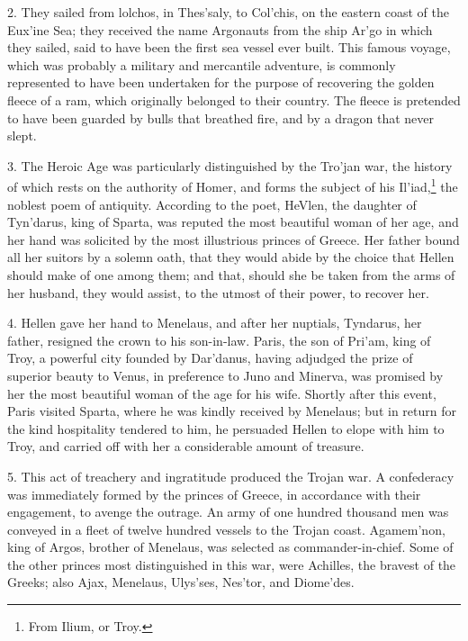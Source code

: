 \documentclass[openany,a4paper]{memoir}
\begin{document}
2. They sailed from lolchos, in Thes'saly, to Col'chis, on 
the eastern coast of the Eux'ine Sea; they received the 
name Argonauts from the ship Ar'go in which they sailed, 
said to have been the first sea vessel ever built. This famous 
voyage, which was probably a military and mercantile adventure, is commonly represented to have been undertaken 
for the purpose of recovering the golden fleece of a ram, 
which originally belonged to their country. The fleece is 
pretended to have been guarded by bulls that breathed fire, 
and by a dragon that never slept. 

3. The Heroic Age was particularly distinguished by the 
Tro'jan war, the history of which rests on the authority of 
Homer, and forms the subject of his Il'iad,\footnote{From Ilium, or Troy.} the noblest poem 
of antiquity. According to the poet, HeVlen, the daughter 
of Tyn'darus, king of Sparta, was reputed the most beautiful woman of her age, and her hand was solicited by the 
most illustrious princes of Greece. Her father bound all her 
suitors by a solemn oath, that they would abide by the choice 
that Hellen should make of one among them; and that, 
should she be taken from the arms of her husband, they would 
assist, to the utmost of their power, to recover her. 


4. Hellen gave her hand to Menelaus, and after her nuptials, Tyndarus, her father, resigned the crown to his son-in-law. Paris, the son of Pri'am, king of Troy, a powerful city 
founded by Dar'danus, having adjudged the prize of superior beauty to Venus, in preference to Juno and Minerva, was 
promised by her the most beautiful woman of the age for 
his wife. Shortly after this event, Paris visited Sparta, 
where he was kindly received by Menelaus; but in return 
for the kind hospitality tendered to him, he persuaded Hellen 
to elope with him to Troy, and carried off with her a considerable amount of treasure. 

5. This act of treachery and ingratitude produced the Trojan war. A confederacy was immediately formed by the 
princes of Greece, in accordance with their engagement, to 
avenge the outrage. An army of one hundred thousand men 
was conveyed in a fleet of twelve hundred vessels to the 
Trojan coast. Agamem'non, king of Argos, brother of Menelaus, was selected as commander-in-chief. Some of the other 
princes most distinguished in this war, were Achilles, the 
bravest of the Greeks; also Ajax, Menelaus, Ulys'ses, Nes'tor, and Diome'des. 
\end{document}

